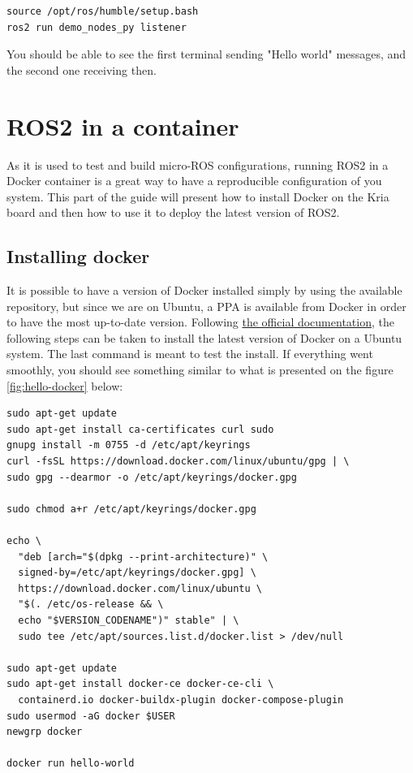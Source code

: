 \documentclass[10pt]{article}
\begin{document}
\begin{tcolorbox}
\begin{verbatim}
source /opt/ros/humble/setup.bash
ros2 run demo_nodes_py listener
\end{verbatim}
\end{tcolorbox}


You should be able to see the first terminal sending "Hello world" messages,
and the second one receiving then.


\section{ROS2 in a container}
As it is used to test and build micro-ROS configurations, running ROS2 in a
Docker container is a great way to have a reproducible configuration
of you system. This part of the guide will present how to install Docker on the
Kria board and then how to use it to deploy the latest version of ROS2.

\subsection{Installing docker}
It is possible to have a version of Docker installed simply by using the available repository, but since we are on Ubuntu, a PPA is available
from Docker in order to have the most up-to-date version.
Following \href{https://docs.docker.com/engine/install/ubuntu/#install-using-the-repository}{the official documentation}, the following steps can be taken to
install the latest version of Docker on a Ubuntu system.
The last command is meant to test the install. If everything went smoothly, you should see something similar to what is presented on the figure \ref{fig:hello-docker} below:
\begin{tcolorbox}
\begin{verbatim}
sudo apt-get update
sudo apt-get install ca-certificates curl sudo
gnupg install -m 0755 -d /etc/apt/keyrings
curl -fsSL https://download.docker.com/linux/ubuntu/gpg | \
sudo gpg --dearmor -o /etc/apt/keyrings/docker.gpg

sudo chmod a+r /etc/apt/keyrings/docker.gpg

echo \
  "deb [arch="$(dpkg --print-architecture)" \
  signed-by=/etc/apt/keyrings/docker.gpg] \
  https://download.docker.com/linux/ubuntu \
  "$(. /etc/os-release && \
  echo "$VERSION_CODENAME")" stable" | \
  sudo tee /etc/apt/sources.list.d/docker.list > /dev/null

sudo apt-get update
sudo apt-get install docker-ce docker-ce-cli \
  containerd.io docker-buildx-plugin docker-compose-plugin
sudo usermod -aG docker $USER
newgrp docker

docker run hello-world
\end{verbatim}
\end{tcolorbox}
\end{document}
